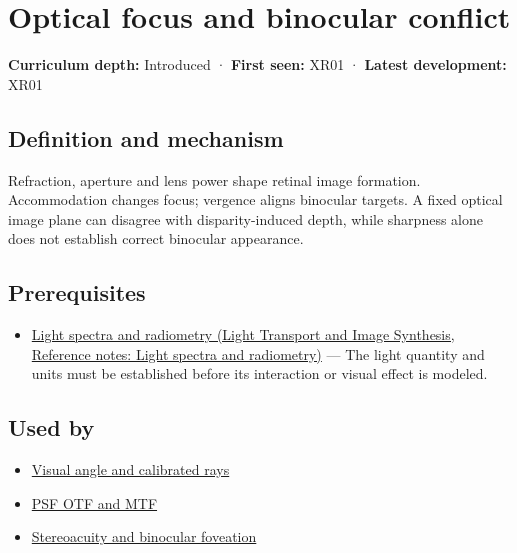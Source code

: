 \hypertarget{appendix-f90cee1be7a4}{}\label{referencestart:appendix-f90cee1be7a4}
\section{Optical focus and binocular conflict}\label{appendix-f90cee1be7a4-optical-focus-and-binocular-conflict}

\textbf{Curriculum depth:} Introduced · \textbf{First seen:} XR01 · \textbf{Latest development:} XR01

\begin{allmightroledefinition}

\subsection{Definition and mechanism}\label{appendix-f90cee1be7a4-definition-and-mechanism}

Refraction, aperture and lens power shape retinal image formation. Accommodation changes focus; vergence aligns binocular targets. A fixed optical image plane can disagree with disparity-induced depth, while sharpness alone does not establish correct binocular appearance.

\end{allmightroledefinition}

\subsection{Prerequisites}\label{appendix-f90cee1be7a4-prerequisites}

\begin{itemize}
\tightlist
\item
  \href{../04-Light-Transport-and-Image-Synthesis/main.pdf\#nameddest=appendix-215c2570199b}{Light spectra and radiometry (Light Transport and Image Synthesis, Reference notes: Light spectra and radiometry)} --- The light quantity and units must be established before its interaction or visual effect is modeled.
\end{itemize}

\subsection{Used by}\label{appendix-f90cee1be7a4-used-by}

\begin{itemize}
\tightlist
\item
  \hyperref[appendix-7d356c396d1a]{Visual angle and calibrated rays}
\item
  \hyperref[appendix-8b76b0efd27f]{PSF OTF and MTF}
\item
  \hyperref[appendix-8dc848f14052]{Stereoacuity and binocular foveation}
\end{itemize}

